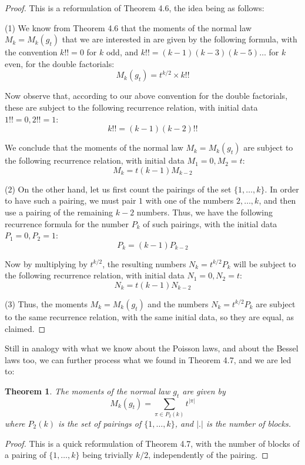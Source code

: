 \documentclass[12pt]{amsbook}
\newtheorem{theorem}{Theorem}[chapter]
\begin{document}
\begin{proof}
This is a reformulation of Theorem 4.6, the idea being as follows:

\medskip

(1) We know from Theorem 4.6 that the moments of the normal law $M_k=M_k(g_t)$ that we are interested in are given by the following formula, with the convention $k!!=0$ for $k$ odd, and $k!!=(k-1)(k-3)(k-5)\ldots$ for $k$ even, for the double factorials:
$$M_k(g_t)=t^{k/2}\times k!!$$

Now observe that, according to our above convention for the double factorials, these are subject to the following recurrence relation, with initial data $1!!=0,2!!=1$:
$$k!!=(k-1)(k-2)!!$$

We conclude that the moments of the normal law $M_k=M_k(g_t)$ are subject to the following recurrence relation, with initial data $M_1=0,M_2=t$:
$$M_k=t(k-1)M_{k-2}$$

(2) On the other hand, let us first count the pairings of the set $\{1,\ldots,k\}$. In order to have such a pairing, we must pair $1$ with one of the numbers $2,\ldots,k$, and then use a pairing of the remaining $k-2$ numbers. Thus, we have the following recurrence formula for the number $P_k$ of such pairings, with the initial data $P_1=0,P_2=1$:
$$P_k=(k-1)P_{k-2}$$

Now by multiplying by $t^{k/2}$, the resulting numbers $N_k=t^{k/2}P_k$ will be subject to the following recurrence relation, with initial data $N_1=0,N_2=t$:
$$N_k=t(k-1)N_{k-2}$$

(3) Thus, the moments $M_k=M_k(g_t)$ and the numbers $N_k=t^{k/2}P_k$ are subject to the same recurrence relation, with the same initial data, so they are equal, as claimed.
\end{proof}

Still in analogy with what we know about the Poisson laws, and about the Bessel laws too, we can further process what we found in Theorem 4.7, and we are led to:

\begin{theorem}
The moments of the normal law $g_t$ are given by
$$M_k(g_t)=\sum_{\pi\in P_2(k)}t^{|\pi|}$$
where $P_2(k)$ is the set of pairings of $\{1,\ldots,k\}$, and $|.|$ is the number of blocks.
\end{theorem}

\begin{proof}
This is a quick reformulation of Theorem 4.7, with the number of blocks of a pairing of $\{1,\ldots,k\}$ being trivially $k/2$, independently of the pairing.
\end{proof}
\end{document}
